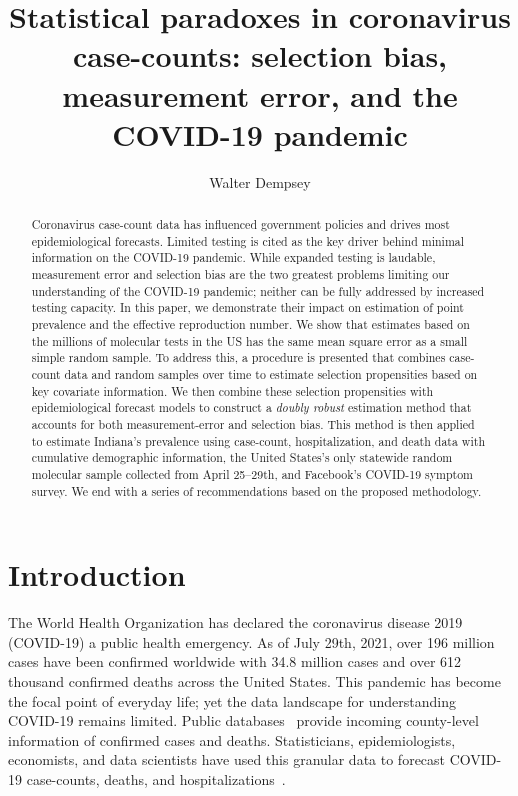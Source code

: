 \documentclass[11pt]{amsart}
\numberwithin{equation}{section}
\theoremstyle{plain}
\begin{document}
\title[Statistical paradoxes in coronavirus case-counts]{Statistical paradoxes in coronavirus case-counts: selection bias, measurement error, and the COVID-19 pandemic} %

\author{Walter Dempsey}
\address{Department of Biostatistics, University of Michigan, Ann Arbor, MI 48109}

\begin{abstract}
  Coronavirus case-count data has influenced government policies and drives most epidemiological forecasts. Limited testing is cited as the key driver behind minimal information on the COVID-19 pandemic. While expanded testing is laudable, measurement error and selection bias are the two greatest problems limiting our understanding of the COVID-19 pandemic; neither can be fully addressed by increased testing capacity. In this paper, we demonstrate their impact on estimation of point prevalence and the effective reproduction number. We show that estimates based on the millions of molecular tests in the US has the same mean square error as a small simple random sample.  To address this, a procedure is presented that combines case-count data and random samples over time to estimate selection propensities based on key covariate information. We then combine these selection propensities with epidemiological forecast models to construct a \emph{doubly robust} estimation method that accounts for both measurement-error and selection bias.  This method is then applied to estimate Indiana's prevalence using case-count, hospitalization, and death data with cumulative demographic information, the United States's only statewide random molecular sample collected from April 25--29th, and Facebook's COVID-19 symptom survey.  We end with a series of recommendations based on the proposed methodology.
\end{abstract}

\maketitle

\newpage


\section{Introduction}
The World Health Organization has declared the coronavirus disease 2019 (COVID-19) a public health emergency.  As of July 29th, 2021, over 196 million cases have been confirmed worldwide with 34.8 million cases and over 612 thousand confirmed deaths across the United States. This pandemic
has become the focal point of everyday life; yet the data landscape for understanding COVID-19 remains limited.  Public databases~\citep{JHU_Lancet,NYT} provide incoming county-level information of confirmed cases and deaths.  Statisticians, epidemiologists, economists, and data scientists have used this granular data to forecast COVID-19 case-counts, deaths, and hospitalizations~\citep{Giordano2020,Song2020,Ray2020,2020.IHME,Wang2020.03,JTD36385}.
\end{document}
